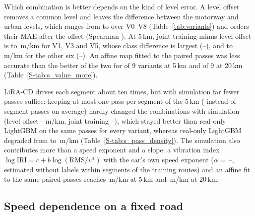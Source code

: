 Which combination is better depends on the kind of level error.
A level offset removes a common level and leaves the difference between the motorway and urban levels, which ranges from \ldSpreadMin{} to \ldSpreadMax{} over V0--V8 (Table~\ref{tab:variants}) and orders their MAE after the offset (Spearman \ldSpreadCalRho).
At 5\,km, joint training minus level offset is \poHiDefDiffCalFiveMin{} to \poHiDefDiffCalFiveMax\,m/km for V1, V3 and V5, whose class difference is largest (\ldHiDefSpreadMin--\ldHiDefSpreadMax), and \poLoDefDiffCalFiveMin{} to \poLoDefDiffCalFiveMax\,m/km for the other six (\ldLoDefSpreadMin--\ldLoDefSpreadMax).
An affine map fitted to the paired passes was less accurate than the better of the two for \poAffWorseFive{} of 9 variants at 5\,km and \poAffWorseTwenty{} of 9 at 20\,km (Table~\ref{S-tab:s_value_more}).

LiRA-CD drives each segment about ten times, but with simulation far fewer passes suffice: keeping at most one pass per segment of the 5\,km (\pdUnitsOne{} instead of \kdUnitsFive{} segment-passes on average) hardly changed the combinations with simulation (level offset \pdCalOneMin--\pdCalOneMax\,m/km, joint training \pdPoolOneMin--\pdPoolOneMax), which stayed better than real-only LightGBM on the same passes \pdOneAllDraws{} for every variant, whereas real-only LightGBM degraded from \vbRealOnlyFive{} to \pdRealOne\,m/km (Table~\ref{S-tab:s_pass_density}).
The simulation also contributes more than a speed exponent and a slope: a vibration index $\log\mathrm{IRI}=c+b\log(\mathrm{RMS}/v^{\alpha})$ with the car's own speed exponent ($\alpha=$\,\nsAlphaCarMin--\nsAlphaCarMax, estimated without labels within segments of the training routes) and an affine fit to the same paired passes reaches \nsCarAffineFive\,m/km at 5\,km and \nsCarAffineTwenty\,m/km at 20\,km.

\subsection{Speed dependence on a fixed road}
\label{sec:res_speed}

